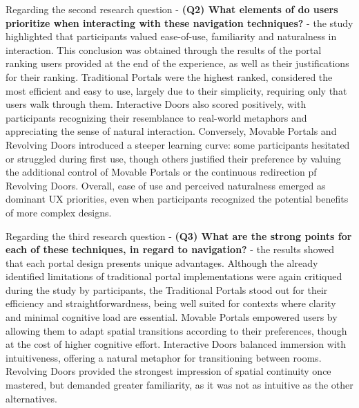 Regarding the second research question - \textbf{(Q2) What elements of  do users prioritize when interacting with these navigation techniques?} - 
the study highlighted that participants valued ease-of-use, familiarity and naturalness in interaction.
This conclusion was obtained through the results of the portal ranking users provided at the end of the experience, as well as their justifications 
for their ranking.
Traditional Portals were the highest ranked, considered the most efficient and easy to use, largely due to their simplicity, requiring only that users walk through them. 
Interactive Doors also scored positively, with participants recognizing their resemblance to real-world metaphors and appreciating the sense of natural interaction. 
Conversely, Movable Portals and Revolving Doors introduced a steeper learning curve: some participants hesitated or struggled during first use, 
though others justified their preference by valuing the additional control of Movable Portals or the continuous redirection pf Revolving Doors. 
Overall, ease of use and perceived naturalness emerged as dominant \gls{UX} priorities, 
even when participants recognized the potential benefits of more complex designs.

Regarding the third research question - \textbf{(Q3) What are the strong points for each of these techniques, in regard to  navigation?} - 
the results showed that each portal design presents unique advantages. 
Although the already identified limitations of traditional portal implementations were again critiqued during the study by participants, 
the Traditional Portals stood out for their efficiency and straightforwardness, being well suited for contexts where clarity and 
minimal cognitive load are essential. 
Movable Portals empowered users by allowing them to adapt spatial transitions according to their preferences,
though at the cost of higher cognitive effort. 
Interactive Doors balanced immersion with intuitiveness, offering a natural metaphor for transitioning between rooms. 
Revolving Doors provided the strongest impression of spatial continuity once mastered, but demanded greater familiarity, as it was not 
as intuitive as the other alternatives. 

